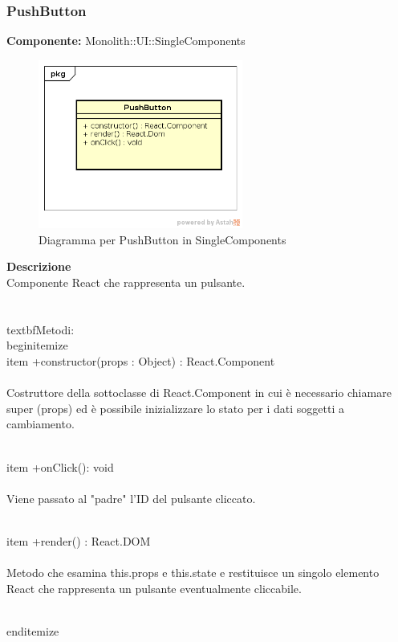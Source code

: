 \clearpage

\subsubsection{PushButton}
\textbf{Componente:}  Monolith::UI::SingleComponents\\
   \FloatBarrier
   \begin{figure}[ht]
   \centering
   \includegraphics[width=0.6\textwidth]{img/single-PushButton}
   \caption{{Diagramma per PushButton in SingleComponents}}
\end{figure}
\FloatBarrier
\textbf{Descrizione}\\
Componente React che rappresenta un pulsante. \\\\
\\textbf{Metodi:} 
\\begin{itemize}
\\item +constructor(props : Object) : React.Component 
\\\\
Costruttore della sottoclasse di React.Component in cui è necessario chiamare super (props) ed è possibile inizializzare lo stato per i dati soggetti a cambiamento.

\\item +onClick(): void 
\\\\ 
Viene passato al "padre" l'ID del pulsante cliccato.

\\item +render() : React.DOM 
\\\\
Metodo che esamina this.props e this.state e restituisce un singolo elemento React che rappresenta un pulsante eventualmente cliccabile.

\\end{itemize} 


